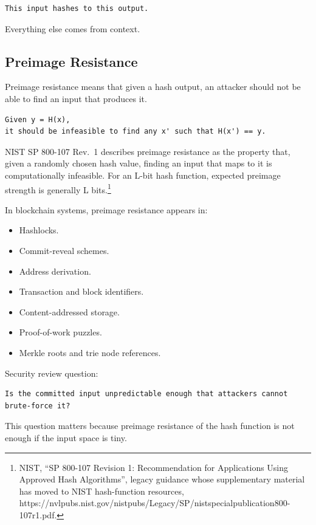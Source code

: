 \begin{lstlisting}
This input hashes to this output.
\end{lstlisting}

Everything else comes from context.

\subsection{Preimage Resistance}

Preimage resistance means that given a hash output, an attacker should
not be able to find an input that produces it.

\begin{lstlisting}
Given y = H(x),
it should be infeasible to find any x' such that H(x') == y.
\end{lstlisting}

NIST SP 800-107 Rev.~1 describes preimage resistance as the property
that, given a randomly chosen hash value, finding an input that maps to
it is computationally infeasible. For an L-bit hash function, expected
preimage strength is generally L bits.\footnote{NIST, ``SP 800-107
  Revision 1: Recommendation for Applications Using Approved Hash
  Algorithms'', legacy guidance whose supplementary material has moved
  to NIST hash-function resources,
  https://nvlpubs.nist.gov/nistpubs/Legacy/SP/nistspecialpublication800-107r1.pdf.}

In blockchain systems, preimage resistance appears in:

\begin{itemize}
\tightlist
\item
  Hashlocks.
\item
  Commit-reveal schemes.
\item
  Address derivation.
\item
  Transaction and block identifiers.
\item
  Content-addressed storage.
\item
  Proof-of-work puzzles.
\item
  Merkle roots and trie node references.
\end{itemize}

Security review question:

\begin{lstlisting}
Is the committed input unpredictable enough that attackers cannot brute-force it?
\end{lstlisting}

This question matters because preimage resistance of the hash function
is not enough if the input space is tiny.

